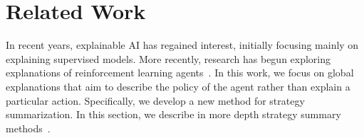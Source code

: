 \section{Related Work}
In recent years, explainable AI has regained interest, initially focusing mainly
on explaining supervised models. More recently, research has begun
exploring explanations of reinforcement learning agents~\cite{XRL_survey,
heuillet2021explainability}. 
In this work, we focus on global explanations that aim to describe the policy of
the agent rather than explain a particular action. Specifically, we develop a
new method for strategy summarization. In this section, we describe in
more depth strategy summary methods~\cite{amir2019summarizing}. 




